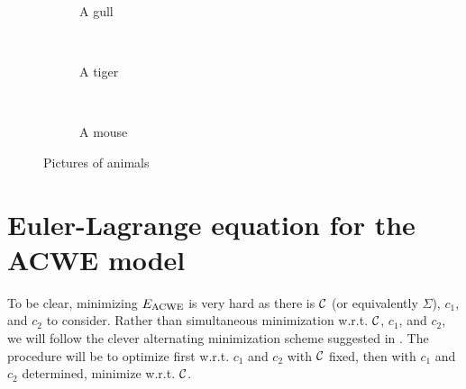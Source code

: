 \begin{figure}
	\centering
	\begin{subfigure}[b]{0.31\textwidth}
		\caption{A gull}
		\label{fig:gull}
	\end{subfigure}
	~ %
	\begin{subfigure}[b]{0.31\textwidth}
		\caption{A tiger}
		\label{fig:tiger}
	\end{subfigure}
	~ %
	\begin{subfigure}[b]{0.31\textwidth}
		\caption{A mouse}
		\label{fig:mouse}
	\end{subfigure}
	\caption{Pictures of animals}\label{fig:fitting}
\end{figure}


\section{Euler-Lagrange equation for the ACWE model}
To be clear, minimizing $E_\textrm{ACWE}$ is very hard as there is $\mathcal{C}$ (or equivalently $\Sigma$), $c_1$, and $c_2$ to consider. Rather than simultaneous minimization w.r.t. $\mathcal{C}$, $c_1$, and $c_2$, we will follow the clever alternating minimization scheme suggested in \cite{chan2001active}. The procedure will be to optimize first w.r.t. $c_1$ and $c_2$ with $\mathcal{C}$ fixed, then with $c_1$ and $c_2$ determined, minimize w.r.t. $\mathcal{C}$.


